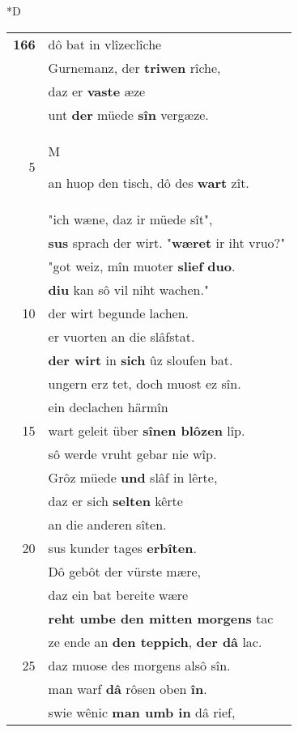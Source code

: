 \documentclass[8pt,a4paper,notitlepage]{article}
\begin{document}
\begin{table}[ht]
\begin{minipage}[t]{0.5\linewidth}
\small
\begin{center}*D
\end{center}
\begin{tabular}{rl}
\textbf{166} & dô bat in vlîzeclîche\\ 
 & Gurnemanz, der \textbf{triwen} rîche,\\ 
 & daz er \textbf{vaste} æze\\ 
 & unt \textbf{der} müede \textbf{sîn} vergæze.\\ 
5 & \begin{large}M\end{large}an huop den tisch, dô des \textbf{wart} zît.\\ 
 & "ich wæne, daz ir müede sît",\\ 
 & \textbf{sus} sprach der wirt. "\textbf{wæret} ir iht vruo?"\\ 
 & "got weiz, mîn muoter \textbf{slief} \textbf{duo}.\\ 
 & \textbf{diu} kan sô vil niht wachen."\\ 
10 & der wirt begunde lachen.\\ 
 & er vuorten an die slâfstat.\\ 
 & \textbf{der wirt} in \textbf{sich} ûz sloufen bat.\\ 
 & ungern erz tet, doch muost ez sîn.\\ 
 & ein declachen härmîn\\ 
15 & wart geleit über \textbf{sînen blôzen} lîp.\\ 
 & sô werde vruht gebar nie wîp.\\ 
 & Grôz müede \textbf{und} slâf in lêrte,\\ 
 & daz er sich \textbf{selten} kêrte\\ 
 & an die anderen sîten.\\ 
20 & sus kunder tages \textbf{erbîten}.\\ 
 & Dô gebôt der vürste mære,\\ 
 & daz ein bat bereite wære\\ 
 & \textbf{reht umbe den mitten morgens} tac\\ 
 & ze ende an \textbf{den teppich}, \textbf{der dâ} lac.\\ 
25 & daz muose des morgens alsô sîn.\\ 
 & man warf \textbf{dâ} rôsen oben \textbf{în}.\\ 
 & swie wênic \textbf{man umb in} dâ rief,\\ 

\end{tabular}
\end{minipage}
\end{table}
\end{document}
